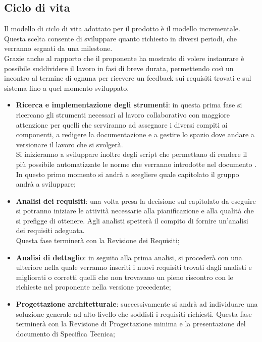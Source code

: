 	\subsection{Ciclo di vita}
	Il modello di ciclo di vita adottato per il prodotto è il modello incrementale. \\
	Questa scelta consente di sviluppare quanto richiesto in diversi periodi, che verranno segnati da una milestone. \\
	Grazie anche al rapporto che il proponente ha mostrato di volere instaurare è possibile suddividere il lavoro in fasi di breve durata, permettendo così un incontro al termine di ognuna per ricevere un feedback sui requisiti trovati e sul sistema fino a quel momento sviluppato.
		\begin{itemize}
			\item \textbf{Ricerca e implementazione degli strumenti}: in questa prima fase si ricercano gli strumenti necessari al lavoro collaborativo con maggiore attenzione per quelli che serviranno ad assegnare i diversi compiti ai componenti, a redigere la documentazione e a gestire lo spazio dove andare a versionare il lavoro che si svolgerà. \\
			Si inizieranno a sviluppare inoltre degli script che permettano di rendere il più possibile automatizzate le norme che verranno introdotte nel documento \docNameVersionNdP. \\
			In questo primo momento si andrà a scegliere quale capitolato il gruppo andrà a sviluppare;

			\item \textbf{Analisi dei requisiti}: una volta presa la decisione sul capitolato da eseguire si potranno iniziare le attività necessarie alla pianificazione e alla qualità che si prefigge di ottenere.
			Agli analisti spetterà il compito di fornire un'analisi dei requisiti adeguata.\\
			Questa fase terminerà con la Revisione dei Requisiti;

			\item \textbf{Analisi di dettaglio}: in seguito alla prima analisi, si procederà con una ulteriore nella quale verranno inseriti i nuovi requisiti trovati dagli analisti e migliorati o corretti quelli che non trovavano un pieno riscontro con le richieste nel proponente nella versione precedente;
			
			\item \textbf{Progettazione architetturale}: successivamente si andrà ad individuare una soluzione generale ad alto livello che soddisfi i requisiti richiesti. Questa fase terminerà con la Revisione di Progettazione minima e la presentazione del documento di Specifica Tecnica;


\end{itemize}

